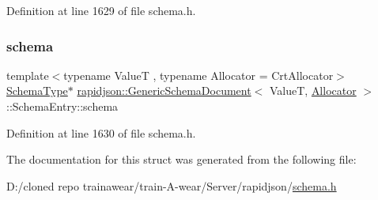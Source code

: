 Definition at line 1629 of file schema.\+h.

\mbox{\label{structrapidjson_1_1_generic_schema_document_1_1_schema_entry_ad3abe83a2bb32f28ee99c120a0de6f39}} 
\subsubsection{\texorpdfstring{schema}{schema}}
{\footnotesize\ttfamily template$<$typename ValueT , typename Allocator  = Crt\+Allocator$>$ \\
\mbox{\hyperlink{classrapidjson_1_1_generic_schema_document_aaf4e7f371de938025f7ed4be3b83266e}{Schema\+Type}}$\ast$ \mbox{\hyperlink{classrapidjson_1_1_generic_schema_document}{rapidjson\+::\+Generic\+Schema\+Document}}$<$ ValueT, \mbox{\hyperlink{classrapidjson_1_1_allocator}{Allocator}} $>$\+::Schema\+Entry\+::schema}



Definition at line 1630 of file schema.\+h.



The documentation for this struct was generated from the following file\+:\begin{DoxyCompactItemize}
\item 
D\+:/cloned repo trainawear/train-\/\+A-\/wear/\+Server/rapidjson/\mbox{\hyperlink{schema_8h}{schema.\+h}}\end{DoxyCompactItemize}
